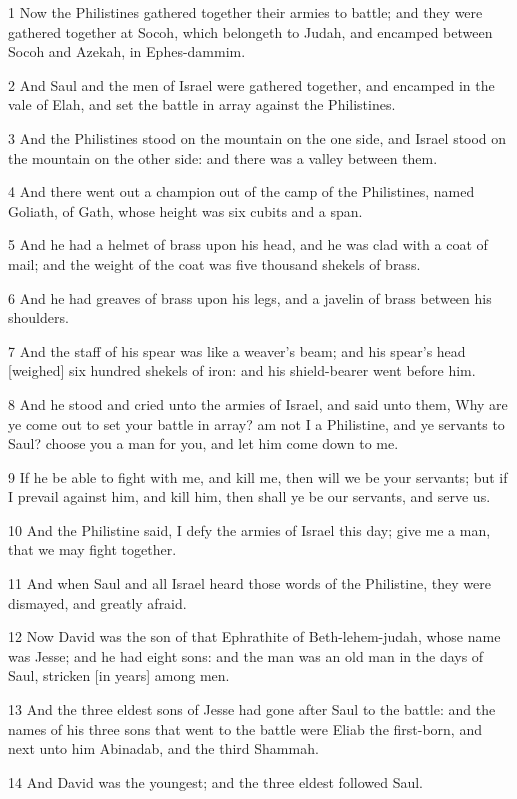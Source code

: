 \par 1 Now the Philistines gathered together their armies to battle; and they were gathered together at Socoh, which belongeth to Judah, and encamped between Socoh and Azekah, in Ephes-dammim.
\par 2 And Saul and the men of Israel were gathered together, and encamped in the vale of Elah, and set the battle in array against the Philistines.
\par 3 And the Philistines stood on the mountain on the one side, and Israel stood on the mountain on the other side: and there was a valley between them.
\par 4 And there went out a champion out of the camp of the Philistines, named Goliath, of Gath, whose height was six cubits and a span.
\par 5 And he had a helmet of brass upon his head, and he was clad with a coat of mail; and the weight of the coat was five thousand shekels of brass.
\par 6 And he had greaves of brass upon his legs, and a javelin of brass between his shoulders.
\par 7 And the staff of his spear was like a weaver's beam; and his spear's head [weighed] six hundred shekels of iron: and his shield-bearer went before him.
\par 8 And he stood and cried unto the armies of Israel, and said unto them, Why are ye come out to set your battle in array? am not I a Philistine, and ye servants to Saul? choose you a man for you, and let him come down to me.
\par 9 If he be able to fight with me, and kill me, then will we be your servants; but if I prevail against him, and kill him, then shall ye be our servants, and serve us.
\par 10 And the Philistine said, I defy the armies of Israel this day; give me a man, that we may fight together.
\par 11 And when Saul and all Israel heard those words of the Philistine, they were dismayed, and greatly afraid.
\par 12 Now David was the son of that Ephrathite of Beth-lehem-judah, whose name was Jesse; and he had eight sons: and the man was an old man in the days of Saul, stricken [in years] among men.
\par 13 And the three eldest sons of Jesse had gone after Saul to the battle: and the names of his three sons that went to the battle were Eliab the first-born, and next unto him Abinadab, and the third Shammah.
\par 14 And David was the youngest; and the three eldest followed Saul.
